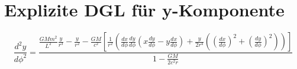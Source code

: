 \section{Explizite DGL für y-Komponente}
\[
\frac{d^2y}{d\phi^2} = \frac{ \frac{GMm^2}{L^2}\frac{y}{r^3} - \frac{y}{r^2} - \frac{GM}{c^2}\left[ \frac{1}{r^2}\left(\frac{dx}{d\phi}\frac{dy}{d\phi}(x\frac{dy}{d\phi}-y\frac{dx}{d\phi}) + \frac{y}{2r^4}\left((\frac{dx}{d\phi})^2 + (\frac{dy}{d\phi})^2\right)\right) \right] }{ 1 - \frac{GM}{2c^2r} }
\]